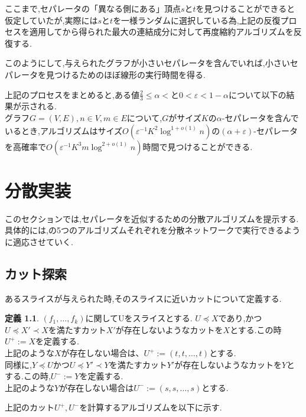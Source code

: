 \documentclass{thesis}
\theoremstyle{definition}
\newtheorem{definition}{定義}
\begin{document}
ここまで,セパレータの「異なる側にある」頂点$s$と$t$を見つけることができると仮定していたが,実際には$s$と$t$を一様ランダムに選択している為,上記の反復プロセスを適用してから得られた最大の連結成分に対して再度縮約アルゴリズムを反復する.\par
このようにして,与えられたグラフが小さいセパレータを含んでいれば,小さいセパレータを見つけるためのほぼ線形の実行時間を得る.\par

上記のプロセスをまとめると,ある値$\frac{2}{3} \leq \alpha <$と$0 < \varepsilon <1-\alpha$について以下の結果が示される.\\
グラフ$G=(V,E),n \in V,m \in E$について,$G$がサイズ$K$の$\alpha$-セパレータを含んでいるとき,アルゴリズムはサイズ$O(\varepsilon^{-1} K^2 \log^{1+o(1)}n)$の$(\alpha + \varepsilon)$-セパレータを高確率で$O(\varepsilon^{-1}K^3m\log^{2+o(1)}n)$時間で見つけることができる.

\chapter{分散実装}
このセクションでは,セパレータを近似するための分散アルゴリズムを提示する.
具体的には,\cite{brandt2017approximating}の5つのアルゴリズムそれぞれを分散ネットワークで実行できるように適応させていく.

\section{カット探索}
あるスライスが与えられた時,そのスライスに近いカットについて定義する.

\begin{definition}
    $(f_1, \dots ,f_k)$に関してUをスライスとする.
    $U\preceq X$であり,かつ$U\preceq X'\prec X$を満たすカット$X'$が存在しないようなカットを$X$とする.この時$U^+:=X$を定義する.\\
    上記のような$X$が存在しない場合は、$U^+:=(t,t,\dots,t)$とする.\\
    同様に,$Y\preceq U$かつ$U\preceq Y'\prec Y$を満たすカット$Y'$が存在しないようなカットを$Y$とする.この時,$U^-:=Y$を定義する.\\
    上記のような$Y$が存在しない場合は$U^-:=(s,s,\dots,s)$とする. 
\end{definition}

上記のカット$U^+,U^-$を計算するアルゴリズムを以下に示す.\par
\end{document}
